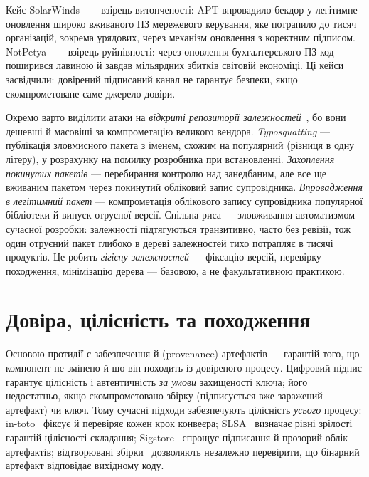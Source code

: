 Кейс SolarWinds~\cite{ch15:solarwinds} --- взірець витонченості: APT впровадило бекдор у легітимне оновлення широко вживаного ПЗ мережевого керування, яке потрапило до тисяч організацій, зокрема урядових, через механізм оновлення з коректним підписом. NotPetya~\cite{ch15:notpetya-ua} --- взірець руйнівності: через оновлення бухгалтерського ПЗ код поширився лавиною й завдав мільярдних збитків світовій економіці. Ці кейси засвідчили: довірений підписаний канал не гарантує безпеки, якщо скомпрометоване саме джерело довіри.

Окремо варто виділити атаки на \emph{відкриті репозиторії залежностей}~\cite{ch15:ohm}, бо вони дешевші й масовіші за компрометацію великого вендора. \emph{Typosquatting} --- публікація зловмисного пакета з іменем, схожим на популярний (різниця в одну літеру), у розрахунку на помилку розробника при встановленні. \emph{Захоплення покинутих пакетів} --- перебирання контролю над занедбаним, але все ще вживаним пакетом через покинутий обліковий запис супровідника. \emph{Впровадження в легітимний пакет} --- компрометація облікового запису супровідника популярної бібліотеки й випуск отруєної версії. Спільна риса --- зловживання автоматизмом сучасної розробки: залежності підтягуються транзитивно, часто без ревізії, тож один отруєний пакет глибоко в дереві залежностей тихо потрапляє в тисячі продуктів. Це робить \emph{гігієну залежностей} --- фіксацію версій, перевірку походження, мінімізацію дерева --- базовою, а не факультативною практикою.

\section{Довіра, цілісність та походження}\label{sec:ch15-integrity}

Основою протидії є забезпечення  й  (provenance) артефактів --- гарантій того, що компонент не змінено й що він походить із довіреного процесу. Цифровий підпис гарантує цілісність і автентичність \emph{за умови} захищеності ключа; його недостатньо, якщо скомпрометовано збірку (підписується вже заражений артефакт) чи ключ. Тому сучасні підходи забезпечують цілісність \emph{усього} процесу: in-toto~\cite{ch15:intoto} фіксує й перевіряє кожен крок конвеєра; SLSA~\cite{ch15:slsa} визначає рівні зрілості гарантій цілісності складання; Sigstore~\cite{ch15:sigstore} спрощує підписання й прозорий облік артефактів; відтворювані збірки~\cite{ch15:reproducible} дозволяють незалежно перевірити, що бінарний артефакт відповідає вихідному коду.

